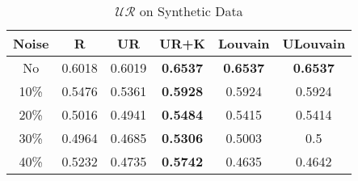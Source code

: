 \documentclass[\main/thesis.tex]{subfiles}
\begin{document}

\begin{table}[h]
\centering
\caption{$\mathcal{UR}$ on Synthetic Data}
\label{unsupervised_synthetic}
\begin{tabular}{|c|c|c|c|c|c|}
\hline
Noise & R      & UR     & UR+K            & Louvain         & ULouvain        \\ \hline
No    & 0.6018 & 0.6019 & \textbf{0.6537} & \textbf{0.6537} & \textbf{0.6537} \\ \hline
10\%  & 0.5476 & 0.5361 & \textbf{0.5928} & 0.5924          & 0.5924          \\ \hline
20\%  & 0.5016 & 0.4941 & \textbf{0.5484} & 0.5415          & 0.5414          \\ \hline
30\%  & 0.4964 & 0.4685 & \textbf{0.5306} & 0.5003          & 0.5             \\ \hline
40\%  & 0.5232 & 0.4735 & \textbf{0.5742} & 0.4635          & 0.4642          \\ \hline
\end{tabular}
\end{table}
\end{document}
